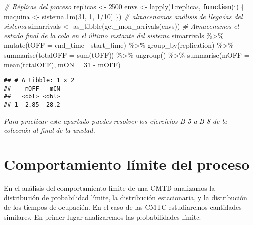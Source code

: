 \documentclass[
]{book}
\newenvironment{Shaded}{\begin{snugshade}}{\end{snugshade}}
\newcommand{\AttributeTok}[1]{\textcolor[rgb]{0.77,0.63,0.00}{#1}}
\newcommand{\CommentTok}[1]{\textcolor[rgb]{0.56,0.35,0.01}{\textit{#1}}}
\newcommand{\ControlFlowTok}[1]{\textcolor[rgb]{0.13,0.29,0.53}{\textbf{#1}}}
\newcommand{\DecValTok}[1]{\textcolor[rgb]{0.00,0.00,0.81}{#1}}
\newcommand{\FunctionTok}[1]{\textcolor[rgb]{0.00,0.00,0.00}{#1}}
\newcommand{\NormalTok}[1]{#1}
\newcommand{\OtherTok}[1]{\textcolor[rgb]{0.56,0.35,0.01}{#1}}
\newcommand{\SpecialCharTok}[1]{\textcolor[rgb]{0.00,0.00,0.00}{#1}}
\theoremstyle{definition}
\theoremstyle{definition}
\theoremstyle{definition}
\theoremstyle{definition}
\theoremstyle{remark}
\begin{document}
\begin{Shaded}
\begin{Highlighting}[]
\CommentTok{\# Réplicas del proceso}
\NormalTok{replicas }\OtherTok{\textless{}{-}} \DecValTok{2500}
\NormalTok{envs }\OtherTok{\textless{}{-}} \FunctionTok{lapply}\NormalTok{(}\DecValTok{1}\SpecialCharTok{:}\NormalTok{replicas, }\ControlFlowTok{function}\NormalTok{(i) \{}
\NormalTok{    maquina }\OtherTok{\textless{}{-}} \FunctionTok{sistema.1m}\NormalTok{(}\DecValTok{31}\NormalTok{, }\DecValTok{1}\NormalTok{, }\DecValTok{1}\SpecialCharTok{/}\DecValTok{10}\NormalTok{)}
\NormalTok{\})}
\CommentTok{\# almacenamos análisis de llegadas del sistema}
\NormalTok{simarrivals }\OtherTok{\textless{}{-}} \FunctionTok{as\_tibble}\NormalTok{(}\FunctionTok{get\_mon\_arrivals}\NormalTok{(envs))}
\CommentTok{\# Almacenamos el estado final de la cola en el último instante del sistema}
\NormalTok{simarrivals }\SpecialCharTok{\%\textgreater{}\%}
  \FunctionTok{mutate}\NormalTok{(}\AttributeTok{tOFF =}\NormalTok{ end\_time }\SpecialCharTok{{-}}\NormalTok{ start\_time) }\SpecialCharTok{\%\textgreater{}\%}
  \FunctionTok{group\_by}\NormalTok{(replication) }\SpecialCharTok{\%\textgreater{}\%}
  \FunctionTok{summarise}\NormalTok{(}\AttributeTok{totalOFF =} \FunctionTok{sum}\NormalTok{(tOFF)) }\SpecialCharTok{\%\textgreater{}\%}
  \FunctionTok{ungroup}\NormalTok{() }\SpecialCharTok{\%\textgreater{}\%}
  \FunctionTok{summarise}\NormalTok{(}\AttributeTok{mOFF =} \FunctionTok{mean}\NormalTok{(totalOFF), }\AttributeTok{mON =} \DecValTok{31} \SpecialCharTok{{-}}\NormalTok{ mOFF)}
\end{Highlighting}
\end{Shaded}

\begin{verbatim}
## # A tibble: 1 x 2
##    mOFF   mON
##   <dbl> <dbl>
## 1  2.85  28.2
\end{verbatim}

\emph{Para practicar este apartado puedes resolver los ejercicios B-5 a B-8 de la colección al final de la unidad.}

\hypertarget{CMTCH}{%
\section{Comportamiento límite del proceso}\label{CMTCH}}

En el análisis del comportamiento límite de una CMTD analizamos la distribución de probabilidad límite, la distribución estacionaria, y la distribución de los tiempos de ocupación. En el caso de las CMTC estudiaremos cantidades similares. En primer lugar analizaremos las probabilidades límite:
\end{document}
